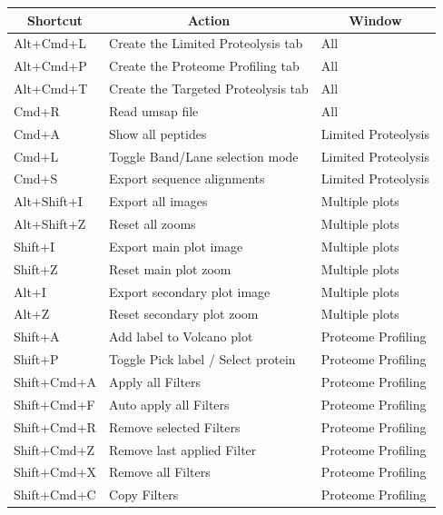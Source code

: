 \begin{table}[h!]
    \centering
    \begin{tabular}{l l l}
        \hline
        \multicolumn{1}{c}{Shortcut} & \multicolumn{1}{c}{Action}& \multicolumn{1}{c}{Window}\\
        \hline
        Alt+Cmd+L  &Create the Limited Proteolysis tab &All\\
        Alt+Cmd+P  &Create the Proteome Profiling tab  &All\\
        Alt+Cmd+T  &Create the Targeted Proteolysis tab&All\\
        Cmd+R      &Read umsap file                    &All\\
        Cmd+A      &Show all peptides                  &Limited Proteolysis\\
        Cmd+L      &Toggle Band/Lane selection mode    &Limited Proteolysis\\
        Cmd+S      &Export sequence alignments         &Limited Proteolysis\\
        Alt+Shift+I&Export all images                  &Multiple plots\\
        Alt+Shift+Z&Reset all zooms                    &Multiple plots\\
        Shift+I    &Export main plot image             &Multiple plots\\
        Shift+Z    &Reset main plot zoom               &Multiple plots\\
        Alt+I      &Export secondary plot image        &Multiple plots\\
        Alt+Z      &Reset secondary plot zoom          &Multiple plots\\
        Shift+A    &Add label to Volcano plot          &Proteome Profiling\\
        Shift+P    &Toggle Pick label / Select protein &Proteome Profiling\\
        Shift+Cmd+A&Apply all Filters                  &Proteome Profiling\\
        Shift+Cmd+F&Auto apply all Filters             &Proteome Profiling\\
        Shift+Cmd+R&Remove selected Filters            &Proteome Profiling\\
        Shift+Cmd+Z&Remove last applied Filter         &Proteome Profiling\\
        Shift+Cmd+X&Remove all Filters                 &Proteome Profiling\\
        Shift+Cmd+C&Copy Filters                       &Proteome Profiling\\

\end{tabular}
\end{table}
